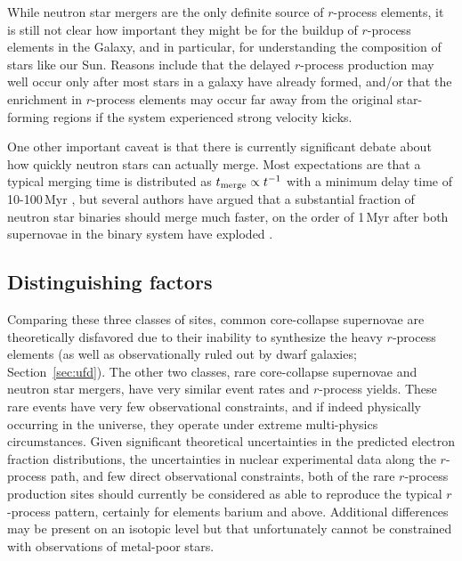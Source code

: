 \documentclass[letterpaper]{article}
\begin{document}
While neutron star mergers are the only definite source of $r$-process elements, it is still not clear how important they might be for the buildup of $r$-process elements in the Galaxy, and in particular, for understanding the composition of stars like our Sun. Reasons include that the delayed $r$-process production may well occur only after most stars in a galaxy have already formed, and/or that the enrichment in $r$-process elements may occur far away from the original star-forming regions if the system experienced strong velocity kicks.

One other important caveat is that there is currently significant debate about how quickly neutron stars can actually merge. Most expectations are that a typical merging time is distributed as $t_{\rm merge} \propto t^{-1}$ with a minimum delay time of 10-100\,Myr \citep[e.g.,][]{Dominik12,Belczynski2018,Chruslinska2018,Neijssel2019}, but several authors have argued that a substantial fraction of neutron star binaries should merge much faster, on the order of 1\,Myr after both supernovae in the binary system have exploded \citep[e.g.,][]{Beniamini2019,Safarzadeh2019}.

\subsection{Distinguishing factors}

Comparing these three classes of sites, common core-collapse supernovae are theoretically disfavored due to their inability to synthesize the heavy $r$-process elements (as well as observationally ruled out by dwarf galaxies; Section~\ref{sec:ufd}).
The other two classes, rare core-collapse supernovae and neutron star mergers, have very similar event rates and $r$-process yields. These rare events have very few observational constraints, and if indeed physically occurring in the universe, they operate under extreme multi-physics circumstances. Given significant theoretical uncertainties in the predicted electron fraction distributions, the uncertainties in nuclear experimental data along the $r$-process path, and few direct observational constraints, both of the rare $r$-process production sites should currently be considered as able to reproduce the typical $r$-process pattern, certainly for elements barium and above. Additional differences may be present on an isotopic level but that unfortunately cannot be constrained with observations of metal-poor stars.
\end{document}
